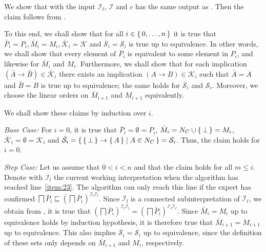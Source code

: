 \begin{Proof}
  We show that  with the input
  $\mathcal{I}_{\ell}$, $\mathcal{I}$ and $c$ has the same output as
  .  Then the claim follows from
  .

  To this end, we shall show that for all $i \in {\ensuremath{\{\, 0, \dots, n \,\}}}$ it is true that
  $\bar P_{i} = P_{i}, \bar M_{i} = M_{i}, \bar{\mathcal{K}}_{i} = \mathcal{K}$ and
  $\bar{\mathcal{S}}_{i} = \mathcal{S}_{i}$ is true up to equivalence.  In other words, we
  shall show that every element of $\bar P_{i}$ is equivalent to some element in $P_{i}$,
  and likewise for $\bar M_{i}$ and $M_{i}$.  Furthermore, we shall show that for each
  implication $(\bar A \to \bar B) \in \bar{\mathcal{K}}_{i}$ there exists an implication
  $(A \to B) \in \mathcal{K}_{i}$ such that $\bar A = A$ and $\bar B = B$ is true up to
  equivalence; the same holds for $\bar{\mathcal{S}}_{i}$ and $\mathcal{S}_{i}$.
  Moreover, we choose the linear orders on $\bar M_{i+1}$ and $M_{i+1}$ equivalently.

  We shall show these claims by induction over $i$.

  \textit{Base Case: }  For $i = 0$, it is true that $\bar P_{i} = \emptyset = P_{i}$,
  $\bar M_{i} = N_{C} \cup {\ensuremath{\{\, \bot \,\}}} = M_{i}$, $\bar{\mathcal{K}}_{i} = \emptyset =
  \mathcal{K}_{i}$ and $\bar{\mathcal{S}}_{i} = {\{\, {\{\, \bot \,\}} \to {\ensuremath{\{\, A \,\}}} \mid A
    \in N_{C} \,\}} = \mathcal{S}_{i}$.  Thus, the claim holds for $i = 0$.

  \textit{Step Case: } Let us assume that $0 < i < n$ and that the claim holds for all $m
  \leq i$.  Denote with $\mathcal{I}_{l}$ the current working interpretation when the
  algorithm has reached line~\ref{item:23}.  The algorithm can only reach this line if the
  expert has confirmed $\bigsqcap \bar P_{i} \sqsubseteq (\bigsqcap \bar
  P_{i})^{\mathcal{I}_{l}\mathcal{I}_{l}}$.  Since $\mathcal{I}_{l}$ is a connected
  subinterpretation of $\mathcal{I}_{\ell}$, we obtain from , it is
  true that $(\bigsqcap \bar P_{i})^{\mathcal{I}_{l}\mathcal{I}_{l}} = (\bigsqcap \bar
  P_{i})^{\mathcal{I}_{\ell}\mathcal{I}_{\ell}}$.  Since $\bar M_{i} = M_{i}$ up to
  equivalence holds by induction hypothesis, it is therefore true that $\bar M_{i+1} =
  M_{i+1}$ up to equivalence.  This also implies $\bar{\mathcal{S}}_{i} = \mathcal{S}_{i}$
  up to equivalence, since the definition of these sets only depends on $\bar M_{i+1}$ and
  $M_{i}$, respectively.


\end{Proof}
